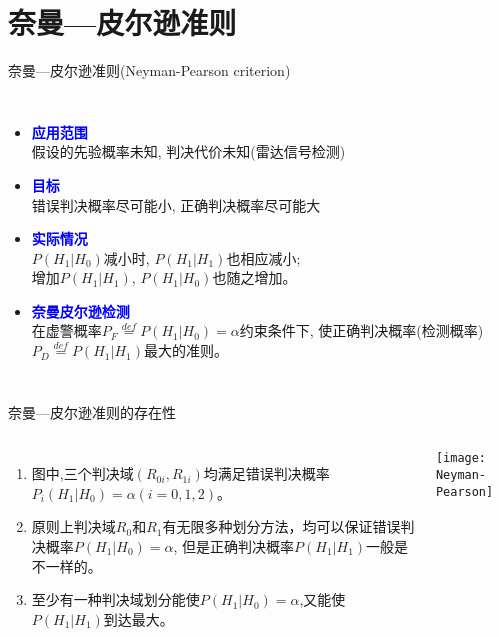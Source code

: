 \section{奈曼---皮尔逊准则}

\begin{frame}[shrink]{奈曼---皮尔逊准则(Neyman-Pearson criterion)}
\begin{columns}
	\begin{itemize}
		\item \textbf{\textcolor{blue}{应用范围}}\\
		假设的先验概率未知, 判决代价未知(雷达信号检测)
		\item \textbf{\textcolor{blue}{目标}}\\
		错误判决概率尽可能小, 正确判决概率尽可能大
		\item \textbf{\textcolor{blue}{实际情况}}\\
		$P(H_1|H_0)$减小时, $P(H_1|H_1)$也相应减小;\\
		增加$P(H_1|H_1)$, $P(H_1|H_0)$也随之增加。
		\item \textbf{\textcolor{blue}{奈曼皮尔逊检测}}\\
		在虚警概率$P_F\mathop{=}\limits^{def}P(H_1|H_0)=\alpha$约束条件下, 使正确判决概率(检测概率)$P_D\mathop{=}\limits^{def}P(H_1|H_1)$最大的准则。
	\end{itemize}
	\leftline{\texttt{[image: R0R1]}}
\end{columns}
\end{frame}

\begin{frame}{奈曼---皮尔逊准则的存在性}
\begin{columns}
	\begin{enumerate}
		\item 图中,三个判决域$(R_{0i},R_{1i})$均满足错误判决概率$P_i(H_1|H_0)=\alpha(i=0,1,2)$。
		\item 原则上判决域$R_0$和$R_1$有无限多种划分方法，均可以保证错误判决概率$P(H_1|H_0)=\alpha$, 但是正确判决概率$P(H_1|H_1)$一般是不一样的。
		\item 至少有一种判决域划分能使$P(H_1|H_0)=\alpha$,又能使$P(H_1|H_1)$到达最大。
	\end{enumerate}
	\texttt{[image: Neyman-Pearson]}
\end{columns}
\end{frame}

